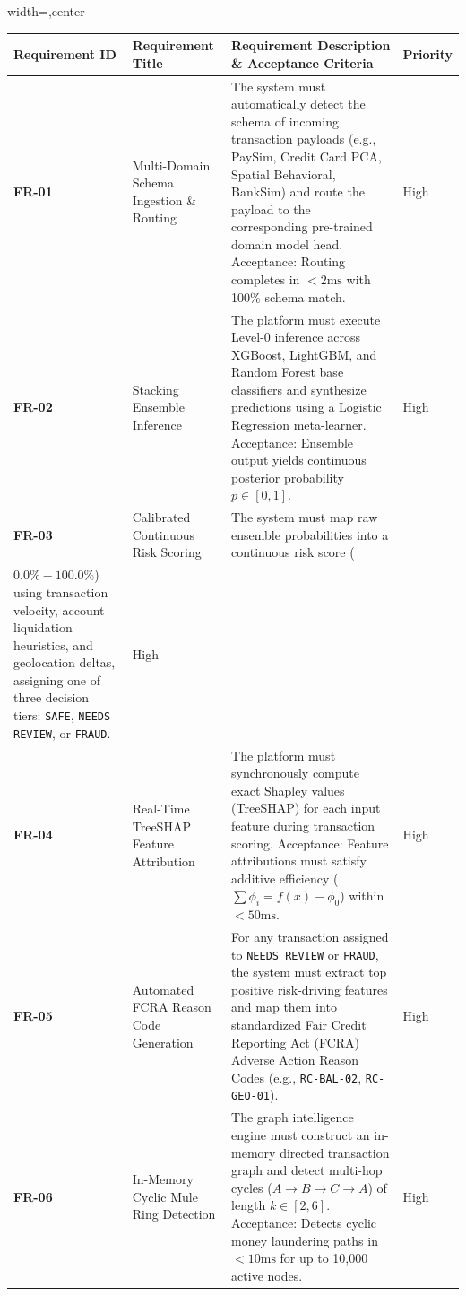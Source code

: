 \documentclass[12pt,a4paper,oneside]{report}
\begin{document}
\begin{table}[H]
\centering
\footnotesize
\begin{adjustbox}{width=\textwidth,center}
\begin{tabular}{| l | l | l | l |}
\hline
\rowcolor{tableheader} \textbf{Requirement ID} & \textbf{Requirement Title} & \textbf{Requirement Description \& Acceptance Criteria} & \textbf{Priority} \\ \hline
\textbf{FR-01} & Multi-Domain Schema Ingestion \& Routing & The system must automatically detect the schema of incoming transaction payloads (e.g., PaySim, Credit Card PCA, Spatial Behavioral, BankSim) and route the payload to the corresponding pre-trained domain model head. Acceptance: Routing completes in $< 2\text{ms}$ with 100\% schema match. & High \\ \hline
\rowcolor{tablealt} \textbf{FR-02} & Stacking Ensemble Inference & The platform must execute Level-0 inference across XGBoost, LightGBM, and Random Forest base classifiers and synthesize predictions using a Logistic Regression meta-learner. Acceptance: Ensemble output yields continuous posterior probability $p \in [0, 1]$. & High \\ \hline
\textbf{FR-03} & Calibrated Continuous Risk Scoring & The system must map raw ensemble probabilities into a continuous risk score (\\$0.0\% - 100.0\%$) using transaction velocity, account liquidation heuristics, and geolocation deltas, assigning one of three decision tiers: \texttt{SAFE}, \texttt{NEEDS REVIEW}, or \texttt{FRAUD}. & High \\ \hline
\rowcolor{tablealt} \textbf{FR-04} & Real-Time TreeSHAP Feature Attribution & The platform must synchronously compute exact Shapley values (TreeSHAP) for each input feature during transaction scoring. Acceptance: Feature attributions must satisfy additive efficiency ($\sum \phi_i = f(x) - \phi_0$) within $< 50\text{ms}$. & High \\ \hline
\textbf{FR-05} & Automated FCRA Reason Code Generation & For any transaction assigned to \texttt{NEEDS REVIEW} or \texttt{FRAUD}, the system must extract top positive risk-driving features and map them into standardized Fair Credit Reporting Act (FCRA) Adverse Action Reason Codes (e.g., \texttt{RC-BAL-02}, \texttt{RC-GEO-01}). & High \\ \hline
\rowcolor{tablealt} \textbf{FR-06} & In-Memory Cyclic Mule Ring Detection & The graph intelligence engine must construct an in-memory directed transaction graph and detect multi-hop cycles ($A \rightarrow B \rightarrow C \rightarrow A$) of length $k \in [2, 6]$. Acceptance: Detects cyclic money laundering paths in $< 10\text{ms}$ for up to 10,000 active nodes. & High \\ \hline

\end{tabular}
\end{adjustbox}
\end{table}
\end{document}
